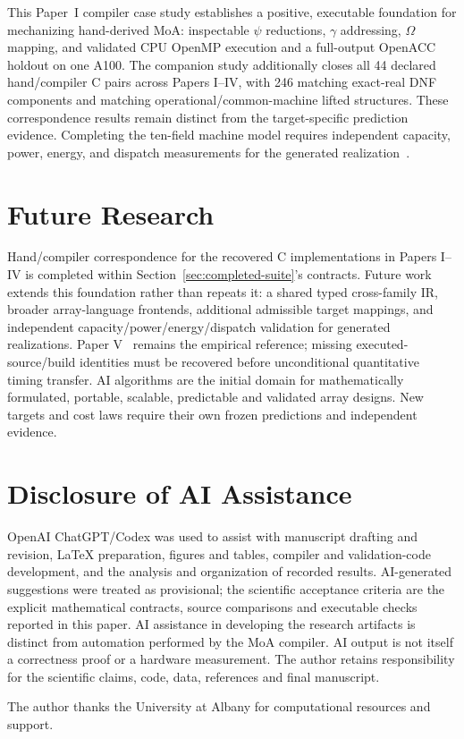 \documentclass[sigplan,10pt,review,balance=false,pbalance=false]{acmart}
\begin{document}
This Paper~I compiler case study establishes a positive, executable foundation for mechanizing hand-derived MoA: inspectable $\psi$ reductions, $\gamma$ addressing, $\Omega$ mapping, and validated CPU OpenMP execution and a full-output OpenACC holdout on one A100. The companion study additionally closes all 44 declared hand/compiler C pairs across Papers I--IV, with 246 matching exact-real DNF components and matching operational/common-machine lifted structures. These correspondence results remain distinct from the target-specific prediction evidence. Completing the ten-field machine model requires independent capacity, power, energy, and dispatch measurements for the generated realization~\cite{prediction,oneDerivation}.

\section{Future Research}
Hand/compiler correspondence for the recovered C implementations in Papers I--IV is completed within Section~\ref{sec:completed-suite}'s contracts. Future work extends this foundation rather than repeats it: a shared typed cross-family IR, broader array-language frontends, additional admissible target mappings, and independent capacity/power/energy/dispatch validation for generated realizations. Paper V~\cite{hardware} remains the empirical reference; missing executed-source/build identities must be recovered before unconditional quantitative timing transfer. AI algorithms are the initial domain for mathematically formulated, portable, scalable, predictable and validated array designs. New targets and cost laws require their own frozen predictions and independent evidence.

\section*{Disclosure of AI Assistance}
OpenAI ChatGPT/Codex was used to assist with manuscript drafting and revision, LaTeX preparation, figures and tables, compiler and validation-code development, and the analysis and organization of recorded results. AI-generated suggestions were treated as provisional; the scientific acceptance criteria are the explicit mathematical contracts, source comparisons and executable checks reported in this paper. AI assistance in developing the research artifacts is distinct from automation performed by the MoA compiler. AI output is not itself a correctness proof or a hardware measurement. The author retains responsibility for the scientific claims, code, data, references and final manuscript.

\begin{acks}
The author thanks the University at Albany for computational resources and support.
\end{acks}


\end{document}
